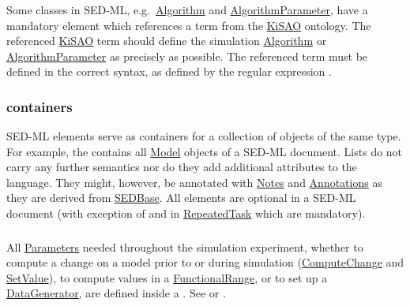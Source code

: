 \subsubsection{}
\label{sec:kisaoid}
Some classes in SED-ML, e.g.\ \hyperref[class:algorithm]{Algorithm} and \hyperref[class:algorithmParameter]{AlgorithmParameter}, have a mandatory element  which references a term from the \hyperref[sec:kisao]{KiSAO} ontology. The referenced \hyperref[sec:kisao]{KiSAO} term  should define the simulation \hyperref[class:algorithm]{Algorithm} or \hyperref[class:algorithmParameter]{AlgorithmParameter} as precisely as possible. The referenced term must be defined in the correct syntax, as defined by the regular expression .


\subsubsection{ containers}
\label{sec:listOf}
SED-ML  elements serve as containers for a collection of objects of the same type. For example, the \hyperref[sec:listOfModels]{} contains all \hyperref[class:model]{Model} objects of a SED-ML document. Lists do not carry any further semantics nor do they add additional attributes to the language. They might, however, be annotated with \hyperref[class:notes]{Notes} and \hyperref[class:annotation]{Annotations} as they are derived from \hyperref[class:sedBase]{SEDBase}. All  elements are optional in a SED-ML document (with exception of \hyperref[sec:listOfRanges]{} and \hyperref[class:subTask]{} in \hyperref[class:repeatedTask]{RepeatedTask} which are mandatory).


\subsubsection{}
\label{sec:listOfParameters}
All \hyperref[class:parameter]{Parameters} needed throughout the simulation experiment, whether to compute a change on a model prior to or during simulation (\hyperref[class:computeChange]{ComputeChange} and \hyperref[class:setValue]{SetValue}), to compute values in a \hyperref[class:functionalRange]{FunctionalRange}, or to set up a \hyperref[class:dataGenerator]{DataGenerator}, are defined inside a . See  or .

